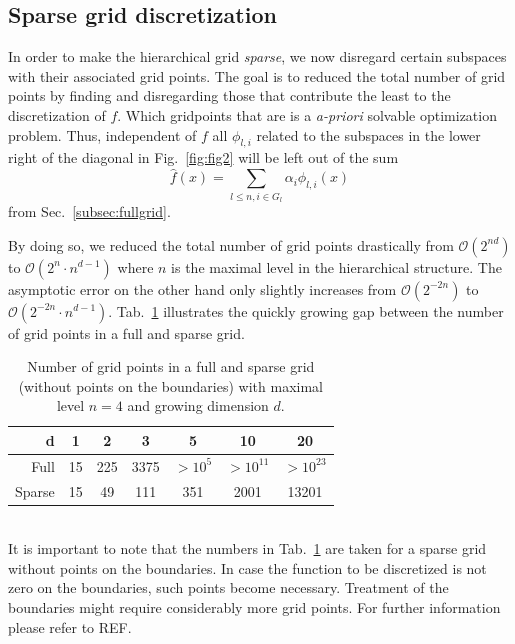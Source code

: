 \subsection{Sparse grid discretization}
In order to make the hierarchical grid \emph{sparse}, we now disregard certain
subspaces with their associated  grid points. The goal is to reduced the total
number of grid points by finding and disregarding those that contribute the
least to the discretization of $f$.
Which gridpoints that are is a \emph{a-priori}
solvable optimization problem. Thus, independent of $f$ all $\phi_{l,i}$
related to the subspaces in the
lower right of the diagonal in Fig.~\ref{fig:fig2} will be left out of the sum
$$\hat{f}(x) =  \sum_{l \leq n, i \in G_l}{\alpha_i\phi_{l,i}(x)}$$
from Sec.~\ref{subsec:fullgrid}.
\par
By doing so, we reduced the total number of grid points drastically
from $\mathcal{O}(2^{nd})$ to $\mathcal{O}(2^{n} \cdot n^{d-1})$ where $n$ is
the maximal level in the hierarchical structure. The asymptotic error on the
other hand only slightly increases from $\mathcal{O}(2^{-2n})$ to
\mbox{$\mathcal{O}(2^{-2n} \cdot n^{d-1})$}. Tab.~\ref{tab:tab1}
illustrates the quickly
growing gap between the number of grid points in a full and sparse grid.
\begin{table}[h]
  \centering
  \begin{tabular}{r | c | c | c | c | c | c}
    d & 1 & 2 & 3 & 5 & 10 & 20 \\
    \hline\hline
    Full & 15 &  225 & 3375 & $>10^5$ & $> 10^{11}$ & $> 10^{23}$ \\
    \hline
    Sparse & 15 & 49 & 111 & 351 & 2001 & 13201 \\
  \end{tabular}
  \captionsetup{width=0.44\textwidth}
  \caption{Number of grid points in a full and sparse grid
    (without points on the boundaries)
    with maximal level $n = 4$ and growing dimension $d$.\label{tab:tab1}}
\end{table}\\
It is important to note that the numbers in Tab.~\ref{tab:tab1} are taken
for a sparse grid without points on the boundaries. In case the function
to be discretized is not zero on the boundaries, such points become necessary.
Treatment of the boundaries might require considerably
more grid points. For further information please refer to REF.

